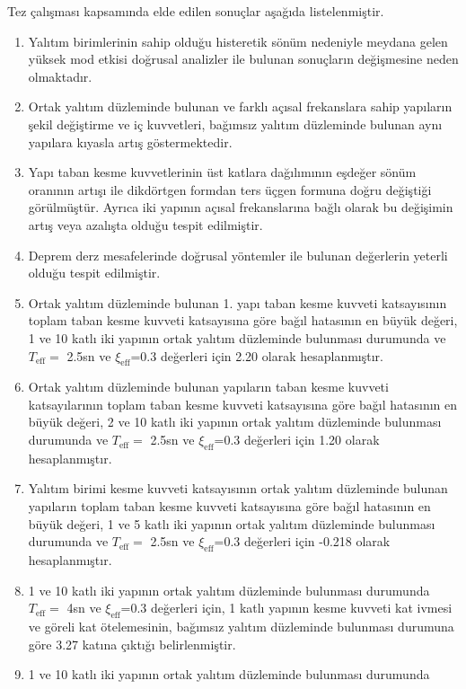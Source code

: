 Tez çalışması kapsamında elde edilen sonuçlar aşağıda listelenmiştir. 
\begin{enumerate}
\item Yalıtım birimlerinin sahip olduğu histeretik sönüm nedeniyle meydana
gelen yüksek mod etkisi doğrusal analizler ile bulunan sonuçların
değişmesine neden olmaktadır.
\item Ortak yalıtım düzleminde bulunan ve farklı açısal frekanslara sahip
yapıların şekil değiştirme ve iç kuvvetleri, bağımsız yalıtım düzleminde
bulunan aynı yapılara kıyasla artış göstermektedir.
\item Yapı taban kesme kuvvetlerinin üst katlara dağılımının eşdeğer sönüm
oranının artışı ile dikdörtgen formdan ters üçgen formuna doğru değiştiği
görülmüştür. Ayrıca iki yapının açısal frekanslarına bağlı olarak
bu değişimin artış veya azalışta olduğu tespit edilmiştir.
\item Deprem derz mesafelerinde doğrusal yöntemler ile bulunan değerlerin
yeterli olduğu tespit edilmiştir.
\item Ortak yalıtım düzleminde bulunan 1. yapı taban kesme kuvveti katsayısının
toplam taban kesme kuvveti katsayısına göre bağıl hatasının en büyük
değeri, 1 ve 10 katlı iki yapının ortak yalıtım düzleminde bulunması
durumunda ve $T_{\text{eff}}=$ 2.5sn ve $\xi_{\text{eff}}$=0.3 değerleri
için 2.20 olarak hesaplanmıştır.
\item Ortak yalıtım düzleminde bulunan yapıların taban kesme kuvveti katsayılarının
toplam taban kesme kuvveti katsayısına göre bağıl hatasının en büyük
değeri, 2 ve 10 katlı iki yapının ortak yalıtım düzleminde bulunması
durumunda ve $T_{\text{eff}}=$ 2.5sn ve $\xi_{\text{eff}}$=0.3 değerleri
için 1.20 olarak hesaplanmıştır.
\item Yalıtım birimi kesme kuvveti katsayısının ortak yalıtım düzleminde
bulunan yapıların toplam taban kesme kuvveti katsayısına göre bağıl
hatasının en büyük değeri, 1 ve 5 katlı iki yapının ortak yalıtım
düzleminde bulunması durumunda ve $T_{\text{eff}}=$ 2.5sn ve $\xi_{\text{eff}}$=0.3
değerleri için -0.218 olarak hesaplanmıştır.
\item 1 ve 10 katlı iki yapının ortak yalıtım düzleminde bulunması durumunda
$T_{\text{eff}}=$ 4sn ve $\xi_{\text{eff}}$=0.3 değerleri için,
1 katlı yapının kesme kuvveti kat ivmesi ve göreli kat ötelemesinin,
bağımsız yalıtım düzleminde bulunması durumuna göre 3.27 katına çıktığı
belirlenmiştir.
\item 1 ve 10 katlı iki yapının ortak yalıtım düzleminde bulunması durumunda

\end{enumerate}
